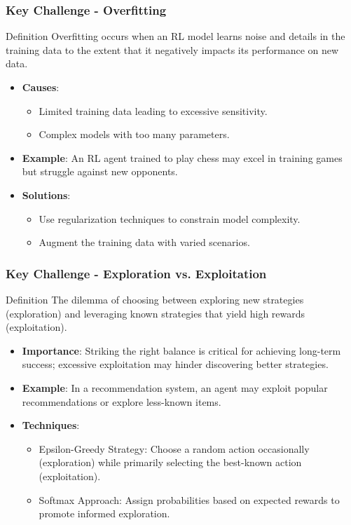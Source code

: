 \documentclass[aspectratio=169]{beamer}
\begin{document}
\begin{frame}[fragile]
    \frametitle{Key Challenge - Overfitting}
    \begin{block}{Definition}
        Overfitting occurs when an RL model learns noise and details in the training data to the extent that it negatively impacts its performance on new data.
    \end{block}
    \begin{itemize}
        \item \textbf{Causes}:
        \begin{itemize}
            \item Limited training data leading to excessive sensitivity.
            \item Complex models with too many parameters.
        \end{itemize}
        \item \textbf{Example}: An RL agent trained to play chess may excel in training games but struggle against new opponents.
        \item \textbf{Solutions}:
        \begin{itemize}
            \item Use regularization techniques to constrain model complexity.
            \item Augment the training data with varied scenarios.
        \end{itemize}
    \end{itemize}
\end{frame}

\begin{frame}[fragile]
    \frametitle{Key Challenge - Exploration vs. Exploitation}
    \begin{block}{Definition}
        The dilemma of choosing between exploring new strategies (exploration) and leveraging known strategies that yield high rewards (exploitation).
    \end{block}
    \begin{itemize}
        \item \textbf{Importance}: Striking the right balance is critical for achieving long-term success; excessive exploitation may hinder discovering better strategies.
        \item \textbf{Example}: In a recommendation system, an agent may exploit popular recommendations or explore less-known items.
        \item \textbf{Techniques}:
        \begin{itemize}
            \item Epsilon-Greedy Strategy: Choose a random action occasionally (exploration) while primarily selecting the best-known action (exploitation).
            \item Softmax Approach: Assign probabilities based on expected rewards to promote informed exploration.
        \end{itemize}
    \end{itemize}
\end{frame}
\end{document}
